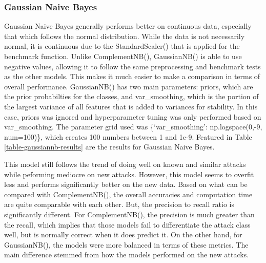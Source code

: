 \subsubsection{Gaussian Naive Bayes}
Gaussian Naive Bayes generally performs better on continuous data, especially that which follows the normal distribution. While the data is not necessarily normal, it is continuous due to the StandardScaler() that is applied for the benchmark function. Unlike ComplementNB(), GaussianNB() is able to use negative values, allowing it to follow the same preprocessing and benchmark tests as the other models. This makes it much easier to make a comparison in terms of overall performance. GaussianNB() has two main parameters: priors, which are the prior probabilties for the classes, and var\_smoothing, which is the portion of the largest variance of all features that is added to variances for stability. In this case, priors was ignored and hyperparameter tuning was only performed based on var\_smoothing. The parameter grid used was \{`var\_smoothing': np.logspace(0,-9, num=100)\}, which creates 100 numbers between 1 and 1e-9. Featured in Table \ref{table-gaussiannb-results} are the results for Gaussian Naive Bayes.



This model still follows the trend of doing well on known and similar attacks while peforming mediocre on new attacks. However, this model seems to overfit less and performs significantly better on the new data. Based on what can be compared with ComplementNB(), the overall accuracies and computation time are quite comparable with each other. But, the precision to recall ratio is significantly different. For ComplementNB(), the precision is much greater than the recall, which implies that those models fail to differentiate the attack class well, but is normally correct when it does predict it. On the other hand, for GaussianNB(), the models were more balanced in terms of these metrics. The main difference stemmed from how the models performed on the new attacks.

